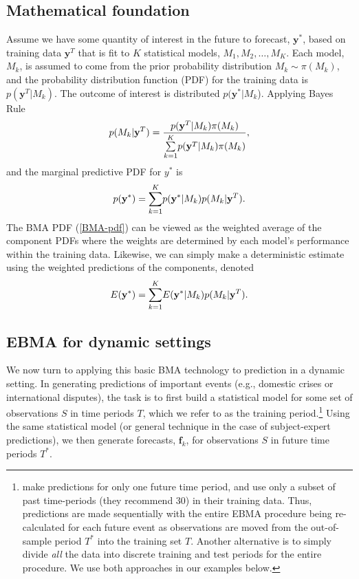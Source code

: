 \documentclass[pdftex,12pt,fullpage,oneside]{amsart}
\begin{document}
\subsection{Mathematical foundation}
Assume we have some quantity of interest in the future to forecast,
$\mathbf{y}^*$, based on training data $\mathbf{y}^T$ that is fit to
$K$ statistical models, $M_1, M_2, \ldots, M_K$. Each model, $M_k$, is
assumed to come from the prior probability distribution $M_k\sim
\pi(M_k)$, and the probability distribution function (PDF) for the
training data is $p(\mathbf{y}^T|M_k)$. The outcome of interest is
distributed $p(\mathbf{y}^*|M_k$).  Applying Bayes Rule
\begin{equation} \small
p(M_k|\mathbf{y}^T) = \frac{p(\mathbf{y}^T|M_k)\pi(M_k)}{\underset{k=1}{\overset{K}{\sum}}p(\mathbf{y}^T|M_k)\pi(M_k)},
\end{equation}
\noindent and the marginal predictive PDF for $y^*$ is
\begin{equation}
\label{BMA-pdf}
\small
p(\mathbf{y}^*) = \underset{k=1}{\overset{K}{\sum}} p(\mathbf{y}^*|M_k)p(M_k|\mathbf{y}^T).
\end{equation}
The BMA PDF (\ref{BMA-pdf}) can be viewed as the weighted average of
the component PDFs where the weights are determined by each model's
performance within the training data.  Likewise, we can simply make a
deterministic estimate using the weighted predictions of the
components, denoted
\begin{equation} \small
E(\mathbf{y}^*) = \underset{k=1}{\overset{K}{\sum}} E(\mathbf{y}^*|M_k)p(M_k|\mathbf{y}^T).
\end{equation}

\subsection{EBMA for dynamic settings}

We now turn to applying this basic BMA technology to prediction in a
dynamic setting.  In generating predictions of important events (e.g.,
domestic crises or international disputes), the task is to first build
a statistical model for some set of observations $S$ in time periods
$T$, which we refer to as the training
period.\footnote{\citet{Sloughter:2007} make predictions for only one
  future time period, and use only a subset of past time-periods (they
  recommend 30) in their training data. Thus, predictions are made
  sequentially with the entire EBMA procedure being re-calculated for
  each future event as observations are moved from the out-of-sample
  period $T^*$ into the training set $T$. Another alternative is to
  simply divide \textit{all} the data into discrete training and test
  periods for the entire procedure.  We use both approaches in our
  examples below.}  Using the same statistical model (or general
technique in the case of subject-expert predictions), we then generate
forecasts, $\mathbf{f}_k$, for observations $S$ in future time periods
$T^*$.
\end{document}
